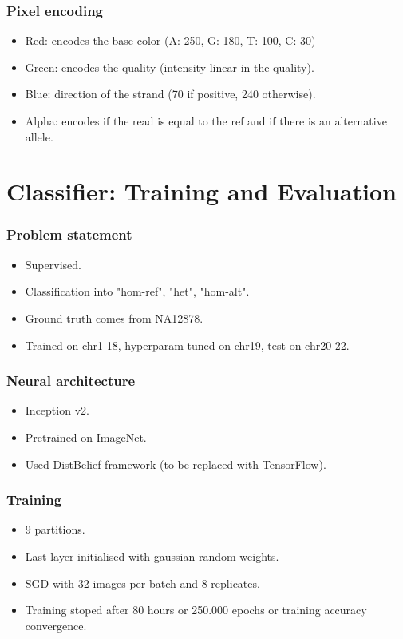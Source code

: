\documentclass{beamer}
\begin{document}
\begin{frame}
    \frametitle{Pixel encoding}

    \begin{itemize}
        \item Red: encodes the base color (A: 250, G: 180, T: 100, C: 30)
        \item Green: encodes the quality (intensity linear in the quality). 
        \item Blue: direction of the strand (70 if positive, 240 otherwise).
        \item Alpha: encodes if the read is equal to the ref and if there is an alternative allele.
    \end{itemize}

\end{frame}

\section{Classifier: Training and Evaluation}

\begin{frame}
    \frametitle{Problem statement}

    \begin{itemize}
        \item Supervised.
        \item Classification into "hom-ref", "het", "hom-alt".
        \item Ground truth comes from NA12878.
        \item Trained on chr1-18, hyperparam tuned on chr19, test on chr20-22.
    \end{itemize}
\end{frame}

\begin{frame}
    \frametitle{Neural architecture}

    \begin{itemize}
        \item Inception v2.
        \item Pretrained on ImageNet.
        \item Used DistBelief framework (to be replaced with TensorFlow).
    \end{itemize}
\end{frame}

\begin{frame}
    \frametitle{Training}

    \begin{itemize}
        \item 9 partitions.
        \item Last layer initialised with gaussian random weights.
        \item SGD with 32 images per batch and 8 replicates.
        \item Training stoped after 80 hours or 250.000 epochs or training accuracy convergence.
    \end{itemize}
\end{frame}
\end{document}

